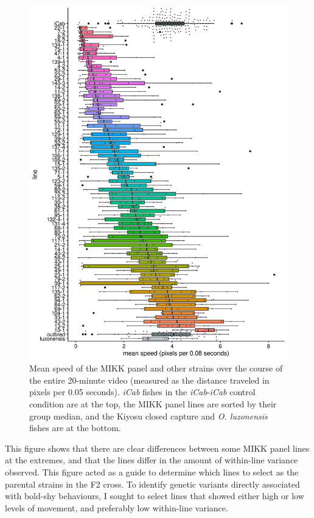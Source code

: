 \documentclass[
]{book}
\begin{document}
\begin{figure}
\includegraphics[width=1\linewidth]{figs/mikk_behaviour/F0_line_mean_speed_0.08} \caption{Mean speed of the MIKK panel and other strains over the course of the entire 20-minute video (measured as the distance traveled in pixels per 0.05 seconds). \emph{\textcolor{iCab_424B4D}{iCab}} fishes in the \emph{\textcolor{iCab_424B4D}{iCab}}-\emph{\textcolor{iCab_424B4D}{iCab}} control condition are at the top, the MIKK panel lines are sorted by their group median, and the Kiyosu closed capture and \emph{O. luzonensis} fishes are at the bottom.}\label{fig:mikk-mean-speed}
\end{figure}

This figure shows that there are clear differences between some MIKK panel lines at the extremes, and that the lines differ in the amount of within-line variance observed. This figure acted as a guide to determine which lines to select as the parental strains in the F2 cross. To identify genetic variants directly associated with bold-shy behaviours, I sought to select lines that showed either high or low levels of movement, and preferably low within-line variance.
\end{document}
